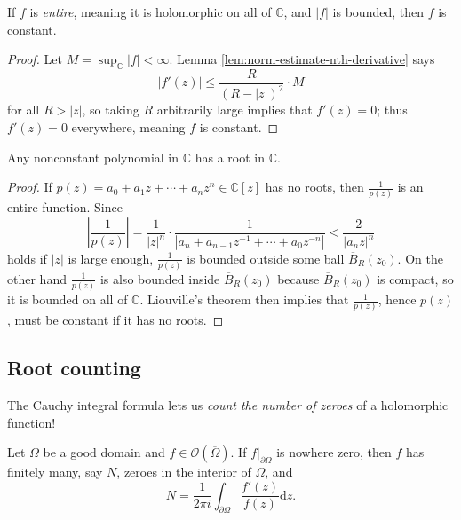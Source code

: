 \documentclass[10pt]{article}
\providecommand{\ol}{\overline}
\providecommand{\dd}{\mathrm d}
\providecommand{\CC}{\mathbb C}
\providecommand{\abs}[1]{\left\lvert{#1}\right\rvert}
\providecommand{\vocab}[1]{{{\sffamily\textit{#1}}}}
\begin{document}
\begin{theorem}
    \label{thm:liouville}
    If $f$ is \vocab{entire}, meaning it is holomorphic on all of $\CC$,
    and $\abs f$ is bounded, then $f$ is constant.
\end{theorem}

\begin{proof}
    Let $M = \sup_\CC \abs f < \infty$.
    Lemma \ref{lem:norm-estimate-nth-derivative} says
    \begin{equation*}
	\abs{f'(z)} \le \frac{R}{(R-\abs z)^2}\cdot M
    \end{equation*}
    for all $R > \abs{z}$, so taking $R$ arbitrarily large
    implies that $f'(z) = 0$; thus $f'(z) = 0$ everywhere,
    meaning $f$ is constant.
\end{proof}

\begin{theorem}
    \label{thm:fundamental-theorem-of-algebra}
    Any nonconstant polynomial in $\CC$ has a root in $\CC$.
\end{theorem}

\begin{proof}
    If $p(z) = a_0 + a_1z + \cdots + a_nz^n \in\CC[z]$
    has no roots, then $\frac 1{p(z)}$ is an entire function. Since
    \begin{equation*}
	\abs{\frac 1{p(z)}} =
	\frac 1{\abs z^n}\cdot\frac 1{\abs{a_n + a_{n-1}z^{-1}
	+ \cdots + a_0z^{-n}}} < \frac 2{\abs{a_nz}^n}
    \end{equation*}
    holds if $\abs z$ is large enough, $\frac 1{p(z)}$
    is bounded outside some ball $\ol B_R(z_0)$.
    On the other hand $\frac 1{p(z)}$ is also bounded inside $\ol B_R(z_0)$
    because $\ol B_R(z_0)$ is compact, so it is bounded on all of $\CC$.
    Liouville's theorem then implies that $\frac 1{p(z)}$,
    hence $p(z)$, must be constant if it has no roots.
\end{proof}

\subsection{Root counting}
The Cauchy integral formula lets us
\emph{count the number of zeroes} of a holomorphic function!
\begin{prop}
    \label{prop:argument-principle}
    Let $\Omega$ be a good domain and $f\in\mathcal O(\ol\Omega)$.
    If $f|_{\partial\Omega}$ is nowhere zero, then $f$ has
    finitely many, say $N$, zeroes in the interior of $\Omega$, and
    \begin{equation*}
        N = \frac 1{2\pi i}\int_{\partial\Omega}\frac{f'(z)}{f(z)}\dd z.
    \end{equation*}
\end{prop}
\end{document}
